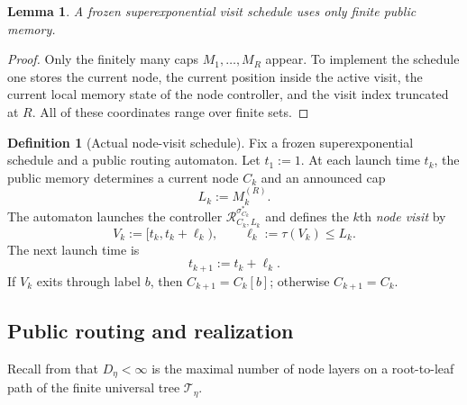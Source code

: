 \documentclass[12pt]{article}
\newtheorem{lemma}[theorem]{Lemma}
\theoremstyle{definition}
\newtheorem{definition}[theorem]{Definition}
\newcommand{\1}{\mathbf{1}}
\newcommand{\cT}{\mathcal{T}}
\begin{document}
\begin{lemma}
\label{lem:frozen-memory}
A frozen superexponential visit schedule uses only finite public memory.
\end{lemma}

\begin{proof}
Only the finitely many caps $M_1,\dots,M_R$ appear. To implement the schedule one
stores the current node, the current position inside the active visit, the
current local memory state of the node controller, and the visit index truncated
at $R$. All of these coordinates range over finite sets.
\end{proof}

\begin{definition}[Actual node-visit schedule]
\label{def:visit-schedule}
Fix a frozen superexponential schedule and a public routing automaton. Let
$t_1:=1$. At each launch time $t_k$, the public memory determines a current node
$C_k$ and an announced cap
\[
L_k:=M_k^{(R)}.
\]
The automaton launches the controller
$\mathcal R_{C_k,L_k}^{\sigma_{C_k}^*}$ and defines the $k$th \emph{node visit}
by
\[
V_k:=[t_k,t_k+\ell_k),
\qquad
\ell_k:=\tau(V_k)\le L_k.
\]
The next launch time is
\[
t_{k+1}:=t_k+\ell_k.
\]
If $V_k$ exits through label $b$, then $C_{k+1}=C_k[b]$; otherwise
$C_{k+1}=C_k$.
\end{definition}

\subsection{Public routing and realization}

Recall from  that $D_\eta<\infty$ is the maximal number of
node layers on a root-to-leaf path of the finite universal tree $\cT_\eta$.
\end{document}
